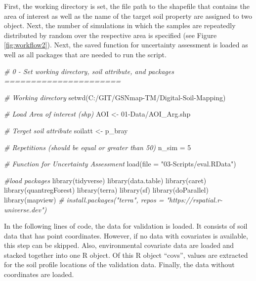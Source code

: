 \documentclass[
  10pt,
  b5paper,
  oneside]{book}
\newenvironment{Shaded}{\begin{snugshade}}{\end{snugshade}}
\newcommand{\AttributeTok}[1]{\textcolor[rgb]{0.77,0.63,0.00}{#1}}
\newcommand{\CommentTok}[1]{\textcolor[rgb]{0.56,0.35,0.01}{\textit{#1}}}
\newcommand{\DecValTok}[1]{\textcolor[rgb]{0.00,0.00,0.81}{#1}}
\newcommand{\FunctionTok}[1]{\textcolor[rgb]{0.00,0.00,0.00}{#1}}
\newcommand{\NormalTok}[1]{#1}
\newcommand{\OtherTok}[1]{\textcolor[rgb]{0.56,0.35,0.01}{#1}}
\newcommand{\StringTok}[1]{\textcolor[rgb]{0.31,0.60,0.02}{#1}}
\begin{document}
First, the working directory is set, the file path to the shapefile that contains the area of interest as well as the name of the target soil property are assigned to two object. Next, the number of simulations in which the samples are repeatedly distributed by random over the respective area is specified (see Figure \ref{fig:workflow2}). Next, the saved function for uncertainty assessment is loaded as well as all packages that are needed to run the script.

\begin{Shaded}
\begin{Highlighting}[]
\CommentTok{\# 0 {-} Set working directory, soil attribute, and packages ======================}

\CommentTok{\# Working directory}
\FunctionTok{setwd}\NormalTok{(}\StringTok{\textquotesingle{}C:/GIT/GSNmap{-}TM/Digital{-}Soil{-}Mapping\textquotesingle{}}\NormalTok{)}

\CommentTok{\# Load Area of interest (shp)}
\NormalTok{AOI }\OtherTok{\textless{}{-}} \StringTok{\textquotesingle{}01{-}Data/AOI\_Arg.shp\textquotesingle{}}

\CommentTok{\# Terget soil attribute}
\NormalTok{soilatt }\OtherTok{\textless{}{-}} \StringTok{\textquotesingle{}p\_bray\textquotesingle{}}

\CommentTok{\# Repetitions (should be equal or greater than 50)}
\NormalTok{n\_sim }\OtherTok{=} \DecValTok{5}

\CommentTok{\# Function for Uncertainty Assessment}
\FunctionTok{load}\NormalTok{(}\AttributeTok{file =} \StringTok{"03{-}Scripts/eval.RData"}\NormalTok{)}

\CommentTok{\#load packages}
\FunctionTok{library}\NormalTok{(tidyverse)}
\FunctionTok{library}\NormalTok{(data.table)}
\FunctionTok{library}\NormalTok{(caret)}
\FunctionTok{library}\NormalTok{(quantregForest)}
\FunctionTok{library}\NormalTok{(terra)}
\FunctionTok{library}\NormalTok{(sf)}
\FunctionTok{library}\NormalTok{(doParallel)}
\FunctionTok{library}\NormalTok{(mapview)}
\CommentTok{\# install.packages("terra", repos = "https://rspatial.r{-}universe.dev")}
\end{Highlighting}
\end{Shaded}

In the following lines of code, the data for validation is loaded. It consists of soil data that has point coordinates. However, if no data with covariates is available, this step can be skipped.
Also, environmental covariate data are loaded and stacked together into one R object. Of this R object ``covs'', values are extracted for the soil profile locations of the validation data.
Finally, the data without coordinates are loaded.
\end{document}
